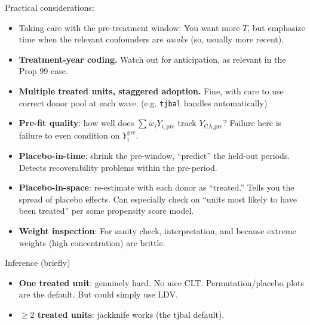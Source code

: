 \documentclass[handout,xcolor=dvipsnames,pdftex,hyperref={colorlinks=false}]{beamer}
\newcommand\makegaps{\addtolength{\itemsep}{.25\baselineskip}}
\newcommand{\ypre}{Y^{\text{pre}}_i}      %
\begin{document}
\begin{frame}{Practical considerations:}

\begin{itemize} \makegaps
  \small
\item<1-> Taking care with the pre-treatment window:  You want more $T$, but emphasize time when the relevant confounders are \emph{awake} (so, usually more recent).

\item<2-> \textbf{Treatment-year coding.} Watch out for anticipation, as relevant in the Prop 99 case.

\item<3-> \textbf{Multiple treated units, staggered adoption.} Fine, with care to use correct donor pool at each wave. (e.g. \texttt{tjbal} handles automatically)

\item<4->  \textbf{Pre-fit quality}: how well does $\sum w_i Y_{i,\text{pre}}$ track $Y_{\text{CA},\text{pre}}$? Failure here is failure to even condition on $\ypre$.

\item<5-> \textbf{Placebo-in-time}: shrink the pre-window, ``predict'' the held-out periods. Detects recoverability problems within the pre-period.

\item<6-> \textbf{Placebo-in-space}: re-estimate with each donor as ``treated.'' Tells you the spread of placebo effects. Can especially check on ``units most likely to have been treated'' per some propensity score model.

\item<7-> \textbf{Weight inspection}: For sanity check, interpretation, and because extreme weights (high concentration) are brittle.
\end{itemize}
\end{frame}



\begin{frame}{Inference (briefly)}
 \begin{itemize}\makegaps
   \item<1-> \textbf{One treated unit}: genuinely hard. No nice CLT. Permutation/placebo plots are the default. But could simply use LDV.
   \item<2-> \textbf{$\geq 2$ treated units}: jackknife works (the tjbal default).
 \end{itemize}
\bigskip
 \end{frame}
\end{document}
